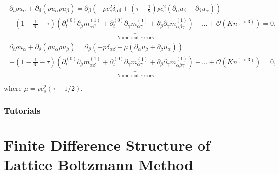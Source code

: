 \documentclass[letterpaper,10pt,english,openany,oneside]{jupyterBook}
\begin{document}
\begin{equation*}
\begin{split}
\begin{array}{l}
\partial_t \rho u_{\alpha} + \partial_{\beta}\left(\rho u_{\alpha}\rho u_{\beta}\right) =  \partial_{\beta}\left( -\rho c_{s}^{2} \delta_{\alpha\beta} + \left(\tau-\displaystyle\frac{1}{2}\right) \rho c_{s}^{2}\left(\partial_{\alpha}u_{\beta}+\partial_{\beta}u_{\alpha}\right) \right) \\
 \underbrace{- \displaystyle\left(1 - \frac{1}{6\tau} - \tau\right) \left( \partial_{t}^{(0)}\partial_{\beta} m^{(1)}_{\alpha\beta} + \partial_{t}^{(0)}\partial_{\gamma} m^{(1)}_{\alpha\gamma} + \partial_{\beta}\partial_{\gamma} m^{(1)}_{\alpha\beta\gamma} \right) + ... + \mathcal{O}(Kn^{(> 3)}) }_{\textrm{Numerical Errors}} =0,\\
\partial_t \rho u_{\alpha} + \partial_{\beta}\left(\rho u_{\alpha}\rho u_{\beta}\right) =  \partial_{\beta}\left( -p \delta_{\alpha\beta} + \mu\left(\partial_{\alpha}u_{\beta}+\partial_{\beta}u_{\alpha}\right) \right) \\
\underbrace{- \displaystyle\left(1 - \frac{1}{6\tau} - \tau\right) \left( \partial_{t}^{(0)}\partial_{\beta} m^{(1)}_{\alpha\beta} + \partial_{t}^{(0)}\partial_{\gamma} m^{(1)}_{\alpha\gamma} + \partial_{\beta}\partial_{\gamma} m^{(1)}_{\alpha\beta\gamma} \right) + ... + \mathcal{O}(Kn^{(> 3)}) }_{\textrm{Numerical Errors}} =0,\\
\end{array}
\end{split}
\end{equation*}
\sphinxAtStartPar
where \(\mu=\rho c_{s}^{2}(\tau-1/2)\).


\section{Tutorials}
\label{\detokenize{Refs/LBM-Study/intro-nse-lbm/Navier-Stokes-Equation:tutorials}}
\sphinxstepscope


\part{Finite Difference Structure of Lattice Boltzmann Method}

\sphinxstepscope
\end{document}
